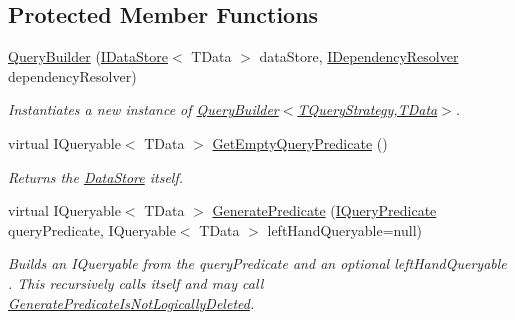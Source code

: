 \subsection*{Protected Member Functions}
\begin{DoxyCompactItemize}
\item 
\hyperlink{classCqrs_1_1Repositories_1_1Queries_1_1QueryBuilder_a8a7b6495f78adedc7b7a82d2c83f17d5_a8a7b6495f78adedc7b7a82d2c83f17d5}{Query\+Builder} (\hyperlink{interfaceCqrs_1_1DataStores_1_1IDataStore}{I\+Data\+Store}$<$ T\+Data $>$ data\+Store, \hyperlink{interfaceCqrs_1_1Configuration_1_1IDependencyResolver}{I\+Dependency\+Resolver} dependency\+Resolver)
\begin{DoxyCompactList}\small\item\em Instantiates a new instance of \hyperlink{classCqrs_1_1Repositories_1_1Queries_1_1QueryBuilder_a8a7b6495f78adedc7b7a82d2c83f17d5_a8a7b6495f78adedc7b7a82d2c83f17d5}{Query\+Builder$<$\+T\+Query\+Strategy,\+T\+Data$>$}. \end{DoxyCompactList}\item 
virtual I\+Queryable$<$ T\+Data $>$ \hyperlink{classCqrs_1_1Repositories_1_1Queries_1_1QueryBuilder_a7dc8f0da3bb4ef54b8cbdda6c50ee0a1_a7dc8f0da3bb4ef54b8cbdda6c50ee0a1}{Get\+Empty\+Query\+Predicate} ()
\begin{DoxyCompactList}\small\item\em Returns the \hyperlink{classCqrs_1_1Repositories_1_1Queries_1_1QueryBuilder_a8a64851b3bf82ed5d2e708cd39d71890_a8a64851b3bf82ed5d2e708cd39d71890}{Data\+Store} itself. \end{DoxyCompactList}\item 
virtual I\+Queryable$<$ T\+Data $>$ \hyperlink{classCqrs_1_1Repositories_1_1Queries_1_1QueryBuilder_a553ad69e77d37f28b40e6c9d8e98b716_a553ad69e77d37f28b40e6c9d8e98b716}{Generate\+Predicate} (\hyperlink{interfaceCqrs_1_1Repositories_1_1Queries_1_1IQueryPredicate}{I\+Query\+Predicate} query\+Predicate, I\+Queryable$<$ T\+Data $>$ left\+Hand\+Queryable=null)
\begin{DoxyCompactList}\small\item\em Builds an I\+Queryable from the {\itshape query\+Predicate}  and an optional {\itshape left\+Hand\+Queryable} . This recursively calls itself and may call \hyperlink{classCqrs_1_1Repositories_1_1Queries_1_1QueryBuilder_a6095cfcbd824578e7c70e2028e1ac6ad_a6095cfcbd824578e7c70e2028e1ac6ad}{Generate\+Predicate\+Is\+Not\+Logically\+Deleted}. \end{DoxyCompactList}\item 

\end{DoxyCompactItemize}

